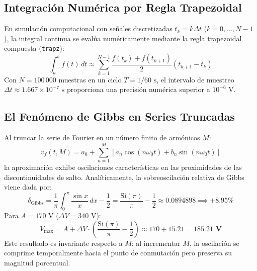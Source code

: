 \documentclass[11pt,a4paper]{article}
\begin{document}
\subsection{Integración Numérica por Regla Trapezoidal}
En simulación computacional con señales discretizadas $t_k = k \Delta t$ ($k = 0, \dots, N-1$), la integral continua se evalúa numéricamente mediante la regla trapezoidal compuesta (\texttt{trapz}):
\begin{equation}
    \int_a^b f(t)\, dt \approx \sum_{k=1}^{N-1} \frac{f(t_k) + f(t_{k+1})}{2} (t_{k+1} - t_k)
\end{equation}
Con $N = 100\,000$ muestras en un ciclo $T = 1/60\text{ s}$, el intervalo de muestreo $\Delta t \approx 1.667 \times 10^{-7}\text{ s}$ proporciona una precisión numérica superior a $10^{-6}\text{ V}$.

\subsection{El Fenómeno de Gibbs en Series Truncadas}
Al truncar la serie de Fourier en un número finito de armónicos $M$:
\begin{equation}
    v_f(t, M) = a_0 + \sum_{n=1}^M \left[ a_n \cos(n\omega_0 t) + b_n \sin(n\omega_0 t) \right]
\end{equation}
la aproximación exhibe oscilaciones características en las proximidades de las discontinuidades de salto. Analíticamente, la sobreoscilación relativa de Gibbs viene dada por:
\begin{equation}
    \delta_{\text{Gibbs}} = \frac{1}{\pi} \int_0^\pi \frac{\sin x}{x}\, dx - \frac{1}{2} = \frac{\text{Si}(\pi)}{\pi} - \frac{1}{2} \approx 0.0894898 \implies +8.95\%
    \label{eq:gibbs_formula}
\end{equation}
Para $A = 170\text{ V}$ ($\Delta V = 340\text{ V}$):
\begin{equation}
    V_{\max} = A + \Delta V \cdot \left(\frac{\text{Si}(\pi)}{\pi} - \frac{1}{2}\right) \approx 170 + 15.21 = \mathbf{185.21\text{ V}}
\end{equation}
Este resultado es invariante respecto a $M$: al incrementar $M$, la oscilación se comprime temporalmente hacia el punto de conmutación pero preserva su magnitud porcentual.
\end{document}
